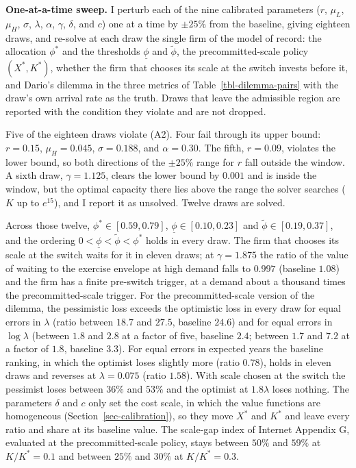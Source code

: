 \documentclass[
  11pt,
  letterpaper,
]{scrartcl}
\begin{document}
\textbf{One-at-a-time sweep.} I perturb each of the nine calibrated
parameters (\(r\), \(\mu_L\), \(\mu_H\), \(\sigma\), \(\lambda\),
\(\alpha\), \(\gamma\), \(\delta\), and \(c\)) one at a time by
\(\pm 25\%\) from the baseline, giving eighteen draws, and re-solve at
each draw the single firm of the model of record: the allocation
\(\phi^*\) and the thresholds \(\underline{\phi}\) and \(\tilde{\phi}\),
the precommitted-scale policy \((X^*, K^*)\), whether the firm that
chooses its scale at the switch invests before it, and Dario's dilemma
in the three metrics of Table~\ref{tbl-dilemma-pairs} with the draw's
own arrival rate as the truth. Draws that leave the admissible region
are reported with the condition they violate and are not dropped.

Five of the eighteen draws violate (A2). Four fail through its upper
bound: \(r = 0.15\), \(\mu_H = 0.045\), \(\sigma = 0.188\), and
\(\alpha = 0.30\). The fifth, \(r = 0.09\), violates the lower bound, so
both directions of the \(\pm 25\%\) range for \(r\) fall outside the
window. A sixth draw, \(\gamma = 1.125\), clears the lower bound by
\(0.001\) and is inside the window, but the optimal capacity there lies
above the range the solver searches (\(K\) up to \(e^{15}\)), and I
report it as unsolved. Twelve draws are solved.

Across those twelve, \(\phi^* \in [0.59, 0.79]\),
\(\underline{\phi} \in [0.10, 0.23]\) and
\(\tilde{\phi} \in [0.19, 0.37]\), and the ordering
\(0 < \underline{\phi} < \tilde{\phi} < \phi^*\) holds in every draw.
The firm that chooses its scale at the switch waits for it in eleven
draws; at \(\gamma = 1.875\) the ratio of the value of waiting to the
exercise envelope at high demand falls to \(0.997\) (baseline \(1.08\))
and the firm has a finite pre-switch trigger, at a demand about a
thousand times the precommitted-scale trigger. For the
precommitted-scale version of the dilemma, the pessimistic loss exceeds
the optimistic loss in every draw for equal errors in \(\lambda\) (ratio
between \(18.7\) and \(27.5\), baseline \(24.6\)) and for equal errors
in \(\log\lambda\) (between \(1.8\) and \(2.8\) at a factor of five,
baseline \(2.4\); between \(1.7\) and \(7.2\) at a factor of \(1.8\),
baseline \(3.3\)). For equal errors in expected years the baseline
ranking, in which the optimist loses slightly more (ratio \(0.78\)),
holds in eleven draws and reverses at \(\lambda = 0.075\) (ratio
\(1.58\)). With scale chosen at the switch the pessimist loses between
\(36\%\) and \(53\%\) and the optimist at \(1.8\lambda\) loses nothing.
The parameters \(\delta\) and \(c\) only set the cost scale, in which
the value functions are homogeneous (Section~\ref{sec-calibration}), so
they move \(X^*\) and \(K^*\) and leave every ratio and share at its
baseline value. The scale-gap index of Internet Appendix G, evaluated at
the precommitted-scale policy, stays between \(50\%\) and \(59\%\) at
\(K/K^* = 0.1\) and between \(25\%\) and \(30\%\) at \(K/K^* = 0.3\).
\end{document}
